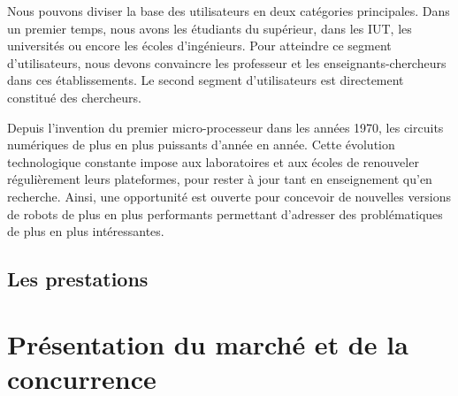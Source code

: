 \documentclass[a4paper,12pt]{report}
\begin{document}

Nous pouvons diviser la base des utilisateurs en deux catégories principales.
Dans un premier temps, nous avons les étudiants du supérieur, dans les IUT, les universités ou encore les écoles d'ingénieurs.
Pour atteindre ce segment d'utilisateurs, nous devons convaincre les professeur et les enseignants-chercheurs dans ces établissements.
Le second segment d'utilisateurs est directement constitué des chercheurs.

Depuis l'invention du premier micro-processeur dans les années 1970, les circuits numériques de plus en plus puissants d'année en année.
Cette évolution technologique constante impose aux laboratoires et aux écoles de renouveler régulièrement leurs plateformes, pour rester à jour tant en enseignement qu'en recherche.
Ainsi, une opportunité est ouverte pour concevoir de nouvelles versions de robots de plus en plus performants permettant d'adresser des problématiques de plus en plus intéressantes.\\


\subsection{Les prestations}

\section{Présentation du marché et de la concurrence}
\end{document}

